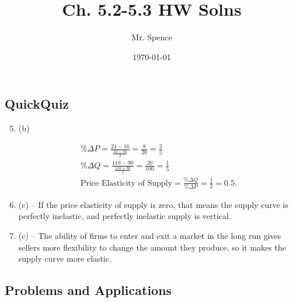 \documentclass{article}
\title{Ch. 5.2-5.3 HW Solns}
\author{Mr. Spence}
\date{\today}
\begin{document}
\maketitle

\subsection*{QuickQuiz}

\begin{enumerate}
\setcounter{enumi}{4}

\item (b)

	\begin{gather*}
	\% \Delta P = \frac{24 - 16}{\frac{24 + 16}{2}} = \frac{8}{20} = \frac{2}{5} \\
	\% \Delta Q = \frac{110 - 90}{\frac{110 + 90}{2}} =  \frac{20}{100} = \frac{1}{5} \\
	\text{Price Elasticity of Supply} = \frac{\% \Delta Q}{\% \Delta P} = \frac{1}{2} = 0.5.
	\end{gather*}
	
\item (c) -- If the price elasticity of supply is zero, that means the supply curve is perfectly inelastic, and perfectly inelastic supply is vertical.

\item (c) -- The ability of firms to enter and exit a market in the long run gives sellers more flexibility to change the amount they produce, so it makes the supply curve more elastic.

\end{enumerate}

\subsection*{Problems and Applications}
\end{document}
